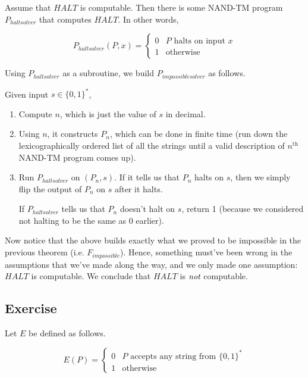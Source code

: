 \documentclass[11pt]{article}
\theoremstyle{definition}
\theoremstyle{remark}
\begin{document}
Assume that $HALT$ is computable. Then there is some NAND-TM program $P_{haltsolver}$ that computes $HALT$. In other words,

   \begin{equation*}
       P_{haltsolver}(P, x) = \begin{cases}
            0 & \text{$P$ halts on input $x$} \\
            1 & \text{otherwise}
        \end{cases}
    \end{equation*}

    Using $P_{haltsolver}$ as a subroutine, we build $P_{impossiblesolver}$ as follows.

    Given input $s \in \{0, 1\}^*$, 
    \begin{enumerate}
        \item{
                Compute $n$, which is just the value of $s$ in decimal.
            }
        \item{
                Using $n$, it constructs $P_n$, which can be done in finite time (run down the
                lexicographically ordered list of all the strings until a valid description of $n^\text{th}$ NAND-TM
                program comes up).
            }
        \item{
                Run $P_{haltsolver}$ on $(P_n, s)$. If it tells us that $P_n$ halts on $s$, then we simply flip the output
                of $P_n$ on $s$ after it halts.

                If $P_{haltsolver}$ tells us that $P_n$ doesn't halt on $s$, return 1 (because we considered not halting to be
                the same as 0 earlier).
            }
    \end{enumerate}

    Now notice that the above builds exactly what we proved to be impossible in the previous theorem (i.e. $F_{impossible}$). Hence, something must've been wrong in the
    assumptions that we've made along the way, and we only made one assumption: $HALT$ is computable. We conclude that
    $HALT$ is $\emph{not}$ computable.

    
    \subsection{Exercise}
    Let $E$ be defined as follows.

   \begin{equation*}
       E(P) = \begin{cases}
           0 & \text{$P$ accepts any string from $\{0, 1\}^*$} \\
            1 & \text{otherwise}
        \end{cases}
    \end{equation*}
\end{document}
